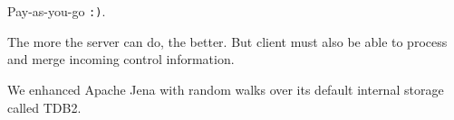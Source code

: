 
\section{\NAME}

Pay-as-you-go \texttt{:)}.

The more the server can do, the better. But client must also be able
to process and merge incoming control information.

We enhanced Apache Jena with random walks over its default internal
storage called TDB2.


